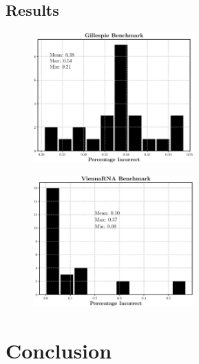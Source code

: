 \documentclass[11pt]{article}
\begin{document}
\subsection{Results}

\begin{multicols}{2}
\begin{figure}[H]
\centering
\includegraphics[width = 0.55\textwidth]{fig/gill_bench}
\caption{}
\label{fig:gill}
\end{figure}
\begin{figure}[H]
\centering
\includegraphics[width = 0.55\textwidth]{fig/v_rna_bench}
\caption{}
\label{fig:vbench}
\end{figure}
\end{multicols}
\section{Conclusion}

\newpage
\nocite{*}
\printbibliography
\end{document}
